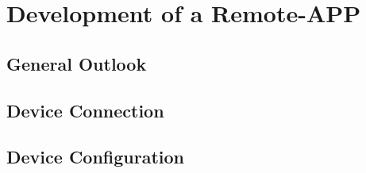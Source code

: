 \section{Development of a Remote-APP}
\subsection{General Outlook}
\subsection{Device Connection}
\subsection{Device Configuration}
